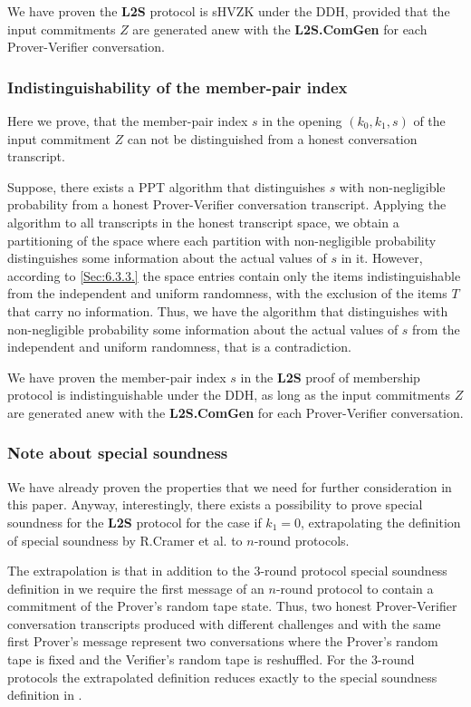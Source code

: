 \documentclass{mathcryptology} %
\theoremstyle{title}
\theoremstyle{titleof}
\begin{document}
    We have proven the \textbf{L2S} protocol is sHVZK under the DDH, provided that the input commitments $Z$ are generated anew with the \textbf{L2S.ComGen} for each Prover-Verifier conversation.


\subsubsection{Indistinguishability of the member-pair index}
    Here we prove, that the member-pair index $s$ in the opening $\left(k_{0}, k_{1}, s\right)$ of the input commitment $Z$ can not be distinguished from a honest conversation transcript.

    Suppose, there exists a PPT algorithm that distinguishes $s$ with non-negligible probability from a honest Prover-Verifier conversation transcript. Applying the algorithm to all transcripts in the honest transcript space, we obtain a partitioning of the space where each partition with non-negligible probability distinguishes some information about the actual values of $s$ in it. However, according to \ref{Sec:6.3.3.} the space entries contain only the items indistinguishable from the independent and uniform randomness, with the exclusion of the items $T$ that carry no information. Thus, we have the algorithm that distinguishes with non-negligible probability some information about the actual values of $s$ from the independent and uniform randomness, that is a contradiction.

    We have proven the member-pair index $s$ in the \textbf{L2S} proof of membership protocol is indistinguishable under the DDH, as long as the input commitments $Z$ are generated anew with the \textbf{L2S.ComGen} for each Prover-Verifier conversation.


\subsubsection{Note about special soundness}
    We have already proven the properties that we need for further consideration in this paper. Anyway, interestingly, there exists a possibility to prove special soundness for the \textbf{L2S} protocol for the case if $k_{1}=0$, extrapolating the definition of special soundness by R.Cramer et al. \cite{5} to $n$-round protocols.

    The extrapolation is that in addition to the $3$-round protocol special soundness definition in \cite{5} we require the first message of an $n$-round protocol to contain a commitment of the Prover's random tape state. Thus, two honest Prover-Verifier conversation transcripts produced with different challenges and with the same first Prover's message represent two conversations where the Prover's random tape is fixed and the Verifier's random tape is reshuffled. For the 3-round protocols the extrapolated definition reduces exactly to the special soundness definition in \cite{5}.
\end{document}
